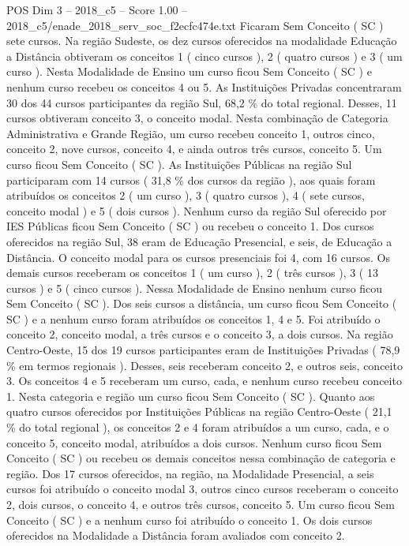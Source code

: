\begin{textsample}{POS Dim 3 – 2018\_c5 – Score 1.00 – 2018\_c5/enade\_2018\_serv\_soc\_f2ecfc474e.txt}
Ficaram Sem Conceito ( SC ) sete cursos.
Na região Sudeste, os dez cursos oferecidos na modalidade Educação a Distância obtiveram os conceitos 1 ( cinco cursos ), 2 ( quatro cursos ) e 3 ( um curso ).
Nesta Modalidade de Ensino um curso ficou Sem Conceito ( SC ) e nenhum curso recebeu os conceitos 4 ou 5.
As Instituições Privadas concentraram 30 dos 44 cursos participantes da região Sul, 68,2 \% do total regional.
Desses, 11 cursos obtiveram conceito 3, o conceito modal.
Nesta combinação de Categoria Administrativa e Grande Região, um curso recebeu conceito 1, outros cinco, conceito 2, nove cursos, conceito 4, e ainda outros três cursos, conceito 5.
Um curso ficou Sem Conceito ( SC ).
As Instituições Públicas na região Sul participaram com 14 cursos ( 31,8 \% dos cursos da região ), aos quais foram atribuídos os conceitos 2 ( um curso ), 3 ( quatro cursos ), 4 ( sete cursos, conceito modal ) e 5 ( dois cursos ).
Nenhum curso da região Sul oferecido por IES Públicas ficou Sem Conceito ( SC ) ou recebeu o conceito 1.
Dos cursos oferecidos na região Sul, 38 eram de Educação Presencial, e seis, de Educação a Distância.
O conceito modal para os cursos presenciais foi 4, com 16 cursos.
Os demais cursos receberam os conceitos 1 ( um curso ), 2 ( três cursos ), 3 ( 13 cursos ) e 5 ( cinco cursos ).
Nessa Modalidade de Ensino nenhum curso ficou Sem Conceito ( SC ).
Dos seis cursos a distância, um curso ficou Sem Conceito ( SC ) e a nenhum curso foram atribuídos os conceitos 1, 4 e 5.
Foi atribuído o conceito 2, conceito modal, a três cursos e o conceito 3, a dois cursos.
Na região Centro-Oeste, 15 dos 19 cursos participantes eram de Instituições Privadas ( 78,9 \% em termos regionais ).
Desses, seis receberam conceito 2, e outros seis, conceito 3.
Os conceitos 4 e 5 receberam um curso, cada, e nenhum curso recebeu conceito 1.
Nesta categoria e região um curso ficou Sem Conceito ( SC ).
Quanto aos quatro cursos oferecidos por Instituições Públicas na região Centro-Oeste ( 21,1 \% do total regional ), os conceitos 2 e 4 foram atribuídos a um curso, cada, e o conceito 5, conceito modal, atribuídos a dois cursos.
Nenhum curso ficou Sem Conceito ( SC ) ou recebeu os demais conceitos nessa combinação de categoria e região.
Dos 17 cursos oferecidos, na região, na Modalidade Presencial, a seis cursos foi atribuído o conceito modal 3, outros cinco cursos receberam o conceito 2, dois cursos, o conceito 4, e outros três cursos, conceito 5.
Um curso ficou Sem Conceito ( SC ) e a nenhum curso foi atribuído o conceito 1.
Os dois cursos oferecidos na Modalidade a Distância foram avaliados com conceito 2.

\end{textsample}

